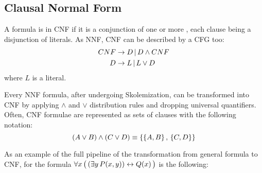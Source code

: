 \subsection{Clausal Normal Form}\label{subsec:clausal_normal_form}
A formula is in CNF if it is a conjunction of one or more , each clause being a disjunction of literals.  
As NNF, CNF can be described by a CFG too:
\begin{equation}
  \begin{aligned}
    CNF &\to D  \, | \,  D \land CNF \\
      D &\to L  \, | \,  L \lor D
  \end{aligned}
\end{equation}
where \(L\) is a literal.

Every NNF formula, after undergoing Skolemization, can be transformed into CNF by applying \(\land\) and \(\lor\) distribution rules and dropping universal quantifiers.
Often, CNF formulae are represented as sets of clauses with the following notation:
\[
(A \lor B) \land (C \lor D) \equiv \{\{A , B\} \, , \, \{C , D\}\}
\]

As an example of the full pipeline of the transformation from general formula to CNF, for the formula \( \forall x  \, \big( \, (\exists y  \,   P(x,y)) \leftrightarrow Q(x)  \,  \big)\)
is the following:


